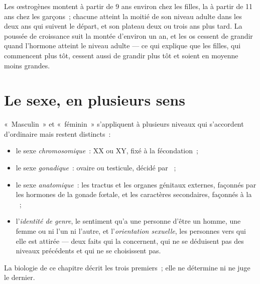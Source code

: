\begin{example}\label{ex:g11:becoming-male-female:curves}
Les œstrogènes montent à partir de 9 ans environ chez les filles, la
 à partir de 11 ans chez les garçons~; chacune atteint la
moitié de son niveau adulte dans les deux ans qui suivent le départ, et
son plateau deux ou trois ans plus tard. La poussée de croissance suit
la montée d'environ un an, et les os cessent de grandir quand l'hormone
atteint le niveau adulte --- ce qui explique que les filles, qui
commencent plus tôt, cessent aussi de grandir plus tôt et soient en
moyenne moins grandes.
\end{example}

\section{Le sexe, en plusieurs sens}

\begin{proposition}\label{prop:g11:becoming-male-female:levels}
«~Masculin~» et «~féminin~» s'appliquent à plusieurs niveaux qui
s'accordent d'ordinaire mais restent distincts~:
\begin{itemize}
  \item le sexe \emph{chromosomique}~: XX ou XY, fixé à la
        fécondation~;
  \item le sexe \emph{gonadique}~: ovaire ou testicule, décidé par
        ~;
  \item le sexe \emph{anatomique}~: les tractus et les organes
        génitaux externes, façonnés par les hormones de la gonade
        fœtale, et les caractères secondaires, façonnés à la
        ~;
  \item l'\emph{identité de genre}, le sentiment qu'a une personne
        d'être un homme, une femme ou ni l'un ni l'autre, et
        l'\emph{orientation sexuelle}, les personnes vers qui elle est
        attirée --- deux faits qui la concernent, qui ne se déduisent
        pas des niveaux précédents et qui ne se choisissent pas.
\end{itemize}
La biologie de ce chapitre décrit les trois premiers~; elle ne
détermine ni ne juge le dernier.
\end{proposition}
\admitted

